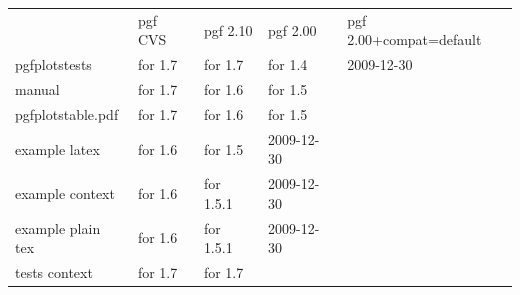 \documentclass[a4paper]{article}
\begin{document}
\begin{tabular}{lllll}
					&	pgf	CVS	&	pgf 2.10	& pgf	2.00	&pgf 2.00+compat=default\\
pgfplotstests		&	for 1.7	&	for 1.7		& for 1.4		&2009-12-30					\\
manual				&	for 1.7	&	for 1.6		& for 1.5		&	\\
pgfplotstable.pdf	&	for 1.7	&	for 1.6		& for 1.5\\
example	latex		&	for 1.6	&	for 1.5     & 2009-12-30					\\
example	context		&	for 1.6	&	for 1.5.1     & 2009-12-30				\\
example	plain tex	&	for 1.6	&	for 1.5.1     & 2009-12-30				\\
tests context		&	for 1.7	&   for 1.7\\
\end{tabular}
\end{document}
